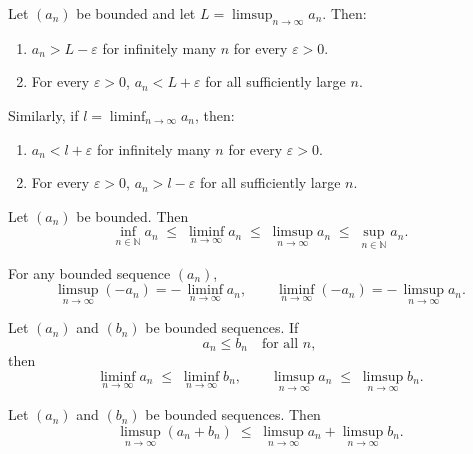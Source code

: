 \begin{theorem}
Let $(a_n)$ be bounded and let $L = \limsup_{n\to\infty} a_n$. Then:

\begin{enumerate}
\item $a_n > L - \varepsilon$ for infinitely many $n$ for every $\varepsilon>0$.
\item For every $\varepsilon>0$, $a_n < L + \varepsilon$ for all sufficiently large $n$.
\end{enumerate}

Similarly, if $l = \liminf_{n\to\infty} a_n$, then:

\begin{enumerate}
\item $a_n < l + \varepsilon$ for infinitely many $n$ for every $\varepsilon>0$.
\item For every $\varepsilon>0$, $a_n > l - \varepsilon$ for all sufficiently large $n$.
\end{enumerate}
\end{theorem}



\begin{theorem}
Let $(a_n)$ be bounded. Then
\[
\inf_{n\in\mathbb{N}} a_n
\;\le\;
\liminf_{n\to\infty} a_n
\;\le\;
\limsup_{n\to\infty} a_n
\;\le\;
\sup_{n\in\mathbb{N}} a_n.
\]
\end{theorem}

\begin{theorem}
For any bounded sequence $(a_n)$,
\[
\limsup_{n\to\infty} (-a_n)
=
-\,\liminf_{n\to\infty} a_n,
\qquad
\liminf_{n\to\infty} (-a_n)
=
-\,\limsup_{n\to\infty} a_n.
\]
\end{theorem}

\begin{theorem}
Let $(a_n)$ and $(b_n)$ be bounded sequences. If
\[
a_n \le b_n \quad \text{for all } n,
\]
then
\[
\liminf_{n\to\infty} a_n
\;\le\;
\liminf_{n\to\infty} b_n,
\qquad
\limsup_{n\to\infty} a_n
\;\le\;
\limsup_{n\to\infty} b_n.
\]
\end{theorem}

\begin{theorem}
Let $(a_n)$ and $(b_n)$ be bounded sequences. Then
\[
\limsup_{n\to\infty} (a_n + b_n)
\;\le\;
\limsup_{n\to\infty} a_n
+
\limsup_{n\to\infty} b_n.
\]
\end{theorem}



